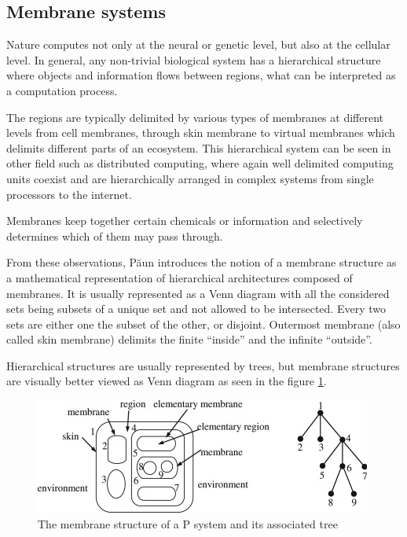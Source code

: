 


\subsection{Membrane systems} %
\label{sub:membrane_systems}

Nature computes not only at the neural or genetic level, but also at the cellular level. In general, any non-trivial biological system has a hierarchical structure where objects and information flows between regions, what can be interpreted as a computation process.

The regions are typically delimited by various types of membranes at different levels from  cell membranes, through skin membrane to virtual membranes which delimits different parts of an ecosystem.
This hierarchical system can be seen in other field such as distributed computing, where again well delimited computing units coexist and are hierarchically arranged in complex systems from single processors to the internet.

Membranes keep together certain chemicals or information and selectively determines which of them may pass through.


From these observations, P\u{a}un \cite{Paun98} introduces the notion of a  membrane structure as a mathematical representation of hierarchical architectures composed of membranes. It is usually represented as a Venn diagram with all the considered sets being subsets of a unique set and not allowed to be intersected. Every two sets are either one the subset of the other, or disjoint. Outermost membrane (also called skin membrane) delimits the finite ``inside'' and the infinite ``outside''.

Hierarchical structures are usually represented by trees, but membrane structures are visually better viewed as Venn diagram as seen in the figure \ref{fig:membrane_structure}.

\begin{figure}
  \centering
  \includegraphics{img/membrane_structure.jpg}
  \caption{The membrane structure of a P system and its associated tree \cite{Zhang20101997AnalyzingRadarSignalsWithMembrane}}
  \label{fig:membrane_structure}
\end{figure}

